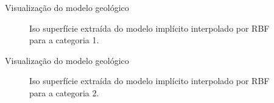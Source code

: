 \documentclass[aspectratio=169]{beamer}
\begin{document}
\begin{frame}{Visualização do modelo geológico}
	\begin{figure}[H]
		\caption{Iso superfície extraída do modelo implícito interpolado por RBF para a categoria 1.} \label{iso_cat1}
		\centering
	\end{figure}
\end{frame}

\begin{frame}{Visualização do modelo geológico}
\begin{figure}[H] 
	\caption{Iso superfície extraída do modelo implícito interpolado por RBF para a categoria 2.} \label{iso_cat2}
	\centering
\end{figure}
\end{frame}
\end{document}
